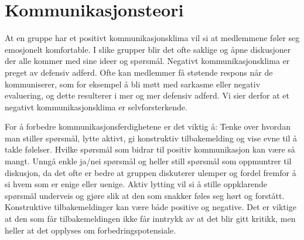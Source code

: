 \section{Kommunikasjonsteori}

At en gruppe har et positivt kommunikasjonsklima vil si at medlemmene føler seg emosjonelt komfortable. 
I slike grupper blir det ofte saklige og åpne diskusjoner der alle kommer med sine ideer og spørsmål. 
Negativt kommunikasjonsklima er preget av defensiv adferd. 
Ofte kan medlemmer få støtende respons når de kommuniserer, som for eksempel å bli møtt med sarkasme eller negativ evaluering, og dette resulterer i mer og mer defensiv adferd. 
Vi sier derfor at et negativt kommunikasjonsklima er selvforsterkende. 
\vspace{\secspace}

For å forbedre kommunikasjonsferdighetene er det viktig å:
Tenke over hvordan man stiller spørsmål, lytte aktivt, gi konstruktiv tilbakemelding og vise evne til å takle følelser. 
Hvilke spørsmål som bidrar til positiv kommunikasjon kan være så mangt. 
Unngå enkle ja/nei spørsmål og heller still spørsmål som oppmuntrer til diskusjon, da det ofte er bedre at gruppen diskuterer ulemper og fordel fremfor å si hvem som er enige eller uenige. 
Aktiv lytting vil si å stille oppklarende spørsmål underveis og gjøre slik at den som snakker føles seg hørt og forstått. 
Konstruktive tilbakemeldinger kan være både positive og negative. 
Det er viktige at den som får tilbakemeldingen ikke får inntrykk av at det blir gitt kritikk, men heller at det opplyses om forbedringspotensiale.
